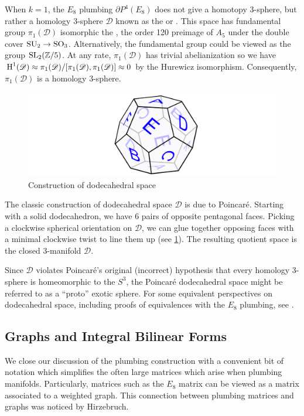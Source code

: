 \begin{remark*}
	When $k=1$, the $E_8$ plumbing $\partial P^{4}(E_8)$ does not give a homotopy $3$-sphere, but rather a homology $3$-sphere $\mathscr{D}$ known as the  or . This space has fundamental group $\pi_1(\mathscr{D})$ isomorphic the , the order 120 preimage of $A_5$ under the double cover $\mathrm{SU}_2 \to \mathrm{SO}_3$. Alternatively, the fundamental group could be viewed as the group $\mathrm{SL}_2(\mathbb{Z}/5)$. 
	At any rate, $\pi_1(\mathscr{D})$ has trivial abelianization so we have $\operatorname{H}^1(\mathscr{D})\approx \pi_1(\mathscr{D})/[\pi_1(\mathscr{D}), \pi_1(\mathscr{D})]\approx 0$ by the Hurewicz isomorphism. Consequently, $\pi_1(\mathscr{D})$ is a homology $3$-sphere.


	\begin{figure}[ht]
		\centering
		\includegraphics[height=1.5in]{diagrams/dodecahedral-space-geometric-construction.png}
		\caption{Construction of dodecahedral space}\label{fig:dodecahedral_space_construction}
	\end{figure}

	The classic construction of dodecahedral space $\mathscr{D}$ is due to Poincar\'e. Starting with a solid dodecahedron, we have 6 pairs of opposite pentagonal faces. Picking a clockwise spherical orientation on $\mathscr{D}$, we can glue together opposing faces with a minimal clockwise twist to line them up (see \cref{fig:dodecahedral_space_construction}). The resulting quotient space is the closed $3$-manifold $\mathscr{D}$.

	Since $\mathscr{D}$ violates Poincar\'e's original (incorrect) hypothesis that every homology $3$-sphere is homeomorphic to the $S^3$, the Poincar\'e dodecahedral space might be referred to as a ``proto'' exotic sphere. For some equivalent perspectives on dodecahedral space, including proofs of equivalences with the $E_8$ plumbing, see \cite{kirby1979eight}.
\end{remark*}

\subsection{Graphs and Integral Bilinear Forms}
We close our discussion of the plumbing construction with a convenient bit of notation which simplifies the often large matrices which arise when plumbing manifolds. Particularly, matrices such as the $E_8$ matrix can be viewed as a matrix associated to a weighted graph.
This connection between plumbing matrices and graphs was noticed by Hirzebruch.

